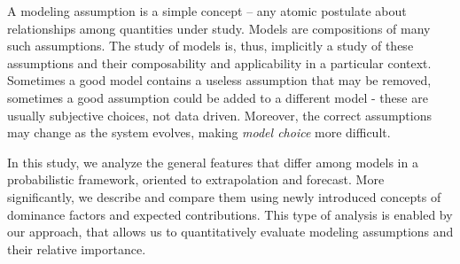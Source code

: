A modeling assumption is a simple concept -- any atomic postulate about relationships among quantities under study. Models are compositions of many such assumptions. The study of models is, thus, implicitly a study of these assumptions and their composability and applicability in a particular context. Sometimes a good model contains a useless assumption that may be removed, sometimes a good assumption could be added to a different model - these are usually subjective choices, not data driven. Moreover, the correct assumptions may change as the system evolves, making {\em model choice} more difficult.


In this study, we analyze the general features that differ among models  in a probabilistic framework, oriented to extrapolation and forecast. More significantly, we describe and compare them using newly introduced  concepts of dominance factors and expected contributions. This type of analysis is enabled by our approach, that allows us to quantitatively evaluate modeling assumptions and their relative importance.

